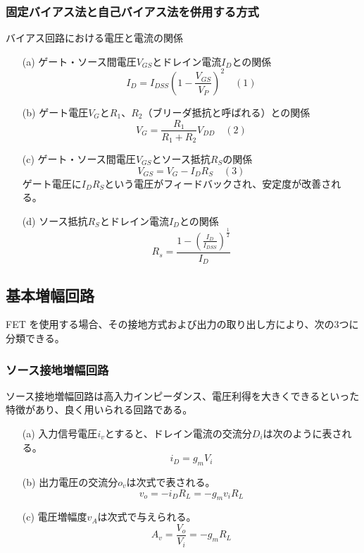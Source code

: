 \documentclass[a4paper,11pt,xelatex,ja=standard]{bxjsarticle}
\begin{document}
        \subsubsection{固定バイアス法と自己バイアス法を併用する方式}
            バイアス回路における電圧と電流の関係

            \begin{enumerate}
                \item[(a)] ゲート・ソース間電圧\( V_{GS} \)とドレイン電流\( I_D \)との関係
                \[ I_D = I_{DSS} \left( 1 - \frac{V_{GS}}{V_P} \right)^2 \quad (1) \]
            
                \item[(b)] ゲート電圧\( V_G \)と\( R_1 \)、\( R_2 \)（ブリーダ抵抗と呼ばれる）との関係
                \[ V_G = \frac{R_1}{R_1 + R_2} V_{DD} \quad (2) \]
            
                \item[(c)] ゲート・ソース間電圧\( V_{GS} \)とソース抵抗\( R_S \)の関係
                \[ V_{GS} = V_G - I_D R_S \quad (3) \]
                ゲート電圧に\( I_D R_S \)という電圧がフィードバックされ、安定度が改善される。
            
                \item[(d)] ソース抵抗\( R_S \)とドレイン電流\( I_D \)との関係
                \[ R_s = \frac{1 - \left( \frac{I_D}{I_{DSS}} \right) ^{\frac{1}{2}}}{I_D} \]

            \end{enumerate}
    \subsection{基本増幅回路}
        FET を使用する場合、その接地方式および出力の取り出し方により、次の3つに分類できる。
        \subsubsection{ソース接地増幅回路}
            ソース接地増幅回路は高入力インピーダンス、電圧利得を大きくできるといった特徴があり、良く用いられる回路である。
            \begin{enumerate}
                \item[(a)] 入力信号電圧$i_v$とすると、ドレイン電流の交流分$D_i$は次のように表される。
                    \[ i_D = g_m V_i \]
                \item[(b)] 出力電圧の交流分$o_v$は次式で表される。
                    \[ v_o = - i_D R_L = - g_m v_i R_L \]
                \item[(c)] 電圧増幅度$v_A$は次式で与えられる。
                    \[ A_v = \frac{V_o}{V_i} = - g_m R_L \]
            \end{enumerate}
\end{document}
